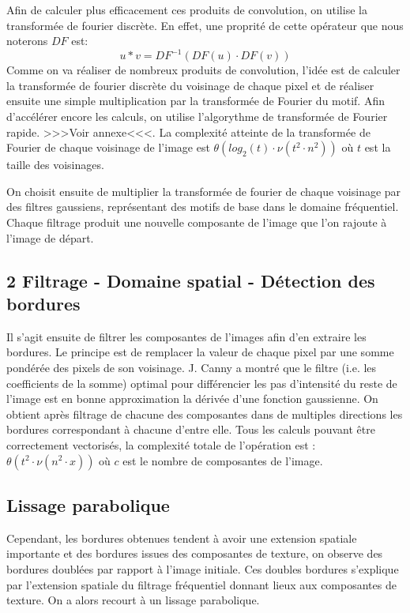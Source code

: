 \documentclass{article}
\begin{document}
\begin{multicols}{2}
Afin de calculer plus efficacement ces produits de convolution, on utilise la transformée de fourier discrète. En effet, une proprité de cette opérateur que nous noterons $DF$ est:
$$u * v = DF^{-1}(DF(u) \cdot DF(v))$$
Comme on va réaliser de nombreux produits de convolution, l'idée est de calculer la transformée de fourier discrète du voisinage de chaque pixel et de réaliser ensuite une simple multiplication par la transformée de Fourier du motif. Afin d'accélérer encore les calculs, on utilise l'algorythme de transformée de Fourier rapide. >>>Voir annexe<<<. La complexité atteinte de la transformée de Fourier de chaque voisinage de l'image est $\theta(log_2(t) \cdot \nu(t^2 \cdot n^2))$ où $t$ est la taille des voisinages.

On choisit ensuite de multiplier la transformée de fourier de chaque voisinage par des filtres gaussiens, représentant des motifs de base dans le domaine fréquentiel. Chaque filtrage produit une nouvelle composante de l'image que l'on rajoute à l'image de départ.

\subsection{2 Filtrage - Domaine spatial - Détection des bordures}

Il s'agit ensuite de filtrer les composantes de l'images afin d'en extraire les bordures. Le principe est de remplacer la valeur de chaque pixel par une somme pondérée des pixels de son voisinage. J. Canny a montré que le filtre (i.e. les coefficients de la somme) optimal pour différencier les pas d'intensité du reste de l'image est en bonne approximation la dérivée d'une fonction gaussienne. On obtient après filtrage de chacune des composantes dans de multiples directions les bordures correspondant à chacune d'entre elle. Tous les calculs pouvant être correctement vectorisés, la complexité totale de l'opération est : $\theta(t^2 \cdot \nu(n^2 \cdot x))$ où $c$ est le nombre de composantes de l'image.

\subsection{Lissage parabolique}

Cependant, les bordures obtenues tendent à avoir une extension spatiale importante et des bordures issues des composantes de texture, on observe des bordures doublées par rapport à l'image initiale. Ces doubles bordures s'explique par l'extension spatiale du filtrage fréquentiel donnant lieux aux composantes de texture. On a alors recourt à un lissage parabolique.


\end{multicols}
\end{document}

